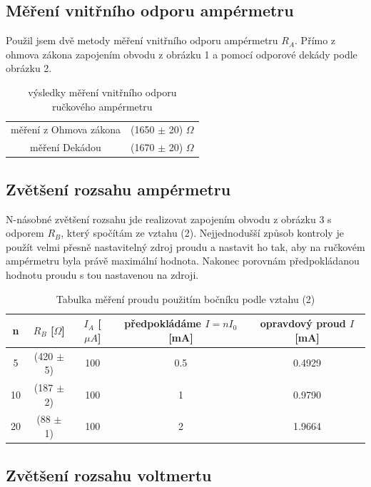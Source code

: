 \documentclass[a4paper,11pt]{article}
\begin{document}
\subsection{Měření vnitřního odporu ampérmetru}

Použil jsem dvě metody měření vnitřního odporu ampérmetru $R_A$. Přímo z ohmova zákona zapojením obvodu z obrázku 1 a pomocí odporové dekády podle obrázku 2. 

\begin{table}[htpb]
  \centering
  \begin{tabular}{ c | c }
    měření z Ohmova zákona & (1650 $\pm$ 20) $\Omega$ \\
    měření Dekádou & (1670 $\pm$ 20) $\Omega$
  \end{tabular}

  \caption{výsledky měření vnitřního odporu ručkového ampérmetru}
\end{table}

\subsection{Zvětšení rozsahu ampérmetru}

N-násobné zvětšení rozsahu jde realizovat zapojením obvodu z obrázku 3 s odporem $R_B$, který spočítám ze vztahu (2). Nejjednodušší způsob kontroly je použít velmi přesně nastavitelný zdroj proudu a nastavit ho tak, aby na ručkovém ampérmetru byla právě maximální hodnota. Nakonec porovnám předpokládanou hodnotu proudu s tou nastavenou na zdroji.

\begin{table}[htpb]
  \centering
  \begin{tabular}{ | c | c | c | c | c | }
    \hline
    n & $R_B$ [$\Omega$] & $I_A$ [$\mu A$] & předpokládáme $I=nI_0$ [mA] & opravdový proud $I$ [mA] \\\hline
    5 & (420 $\pm$ 5) & 100 & 0.5 & 0.4929 \\
    10 & (187 $\pm$ 2) & 100 & 1 & 0.9790 \\
    20 & (88 $\pm$ 1) & 100 & 2 & 1.9664 \\\hline
  \end{tabular}
  \caption{Tabulka měření proudu použitím bočníku podle vztahu (2)}
\end{table}

\subsection{Zvětšení rozsahu voltmertu}
\end{document}
